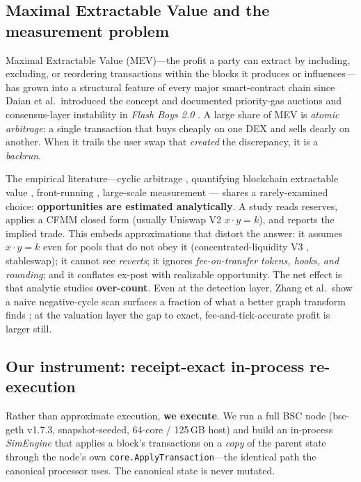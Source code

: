 \documentclass[11pt]{article}
\newcommand{\code}[1]{\texttt{#1}}
\begin{document}
\subsection{Maximal Extractable Value and the measurement problem}
Maximal Extractable Value (MEV)---the profit a party can extract by including,
excluding, or reordering transactions within the blocks it produces or
influences---has grown into a structural feature of every major smart-contract
chain since Daian et al.\ introduced the concept and documented priority-gas
auctions and consensus-layer instability in \emph{Flash Boys 2.0}
\cite{daian2020flashboys}. A large share of MEV is \emph{atomic arbitrage}: a
single transaction that buys cheaply on one DEX and sells dearly on another. When
it trails the user swap that \emph{created} the discrepancy, it is a \emph{backrun}.

The empirical literature---cyclic arbitrage \cite{wang2021cyclic}, quantifying
blockchain extractable value \cite{qin2022quantifying}, front-running
\cite{torres2021frontrunner}, large-scale measurement \cite{mclaughlin2023arbitrage}---
shares a rarely-examined choice: \textbf{opportunities are estimated analytically}.
A study reads reserves, applies a CFMM closed form (usually Uniswap V2 $x\cdot y=k$),
and reports the implied trade. This embeds approximations that distort the answer:
it assumes $x\cdot y=k$ even for pools that do not obey it (concentrated-liquidity
V3 \cite{adams2021uniswapv3}, stableswap); it cannot see \emph{reverts}; it ignores
\emph{fee-on-transfer tokens, hooks, and rounding}; and it conflates ex-post with
realizable opportunity. The net effect is that analytic studies \textbf{over-count}.
Even at the detection layer, Zhang et al.\ show a naive negative-cycle scan surfaces
a fraction of what a better graph transform finds \cite{zhang2024improved}; at the
valuation layer the gap to exact, fee-and-tick-accurate profit is larger still.

\subsection{Our instrument: receipt-exact in-process re-execution}
Rather than approximate execution, \textbf{we execute}. We run a full BSC node
(bsc-geth v1.7.3, snapshot-seeded, 64-core / 125\,GB host) and build an in-process
\emph{SimEngine} that applies a block's transactions on a \emph{copy} of the parent
state through the node's own \code{core.ApplyTransaction}---the identical path the
canonical processor uses. The canonical state is never mutated.
\end{document}
